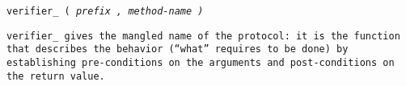 
\tt{verifier_ (} \it{prefix} \tt{,} \it{method-name} \tt{)}


\tt{verifier_} gives the mangled name of the protocol: it is the function
that describes the behavior (``$what$'' requires to be done) by establishing
pre-conditions on the arguments and post-conditions on the return value.
